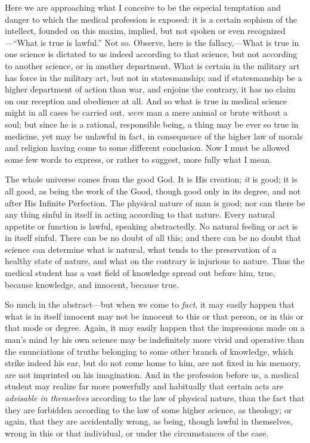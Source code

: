 Here we are approaching what I conceive to be the especial
temptation and danger to which the medical profession is exposed: it
is a certain sophism of the intellect, founded on this maxim, implied,
but not spoken or even recognized—``What is true is
lawful.'' Not so. Observe, here is the fallacy,—What is true in
one science is dictated to us indeed according to that science,
but not according to another science, or in another department. What
is certain in the military art has force in the military art, but not
in statesmanship; and if statesmanship be a higher department of
action than war, and enjoins the contrary, it has no claim on our
reception and obedience at all. And so what is true in medical science
might in all cases be carried out, \emph{were} man a mere animal or
brute without a soul; but since he is a rational, responsible being, a
thing may be ever so true in medicine, yet may be unlawful in fact, in
consequence of the higher law of morals and religion having come to
some different conclusion. Now I must be allowed some few words to
express, or rather to suggest, more fully what I mean.

The whole universe comes from the good God. It is His creation; \emph{it}
is good; it is all good, as being the work of the Good, though good
only in its degree, and not after His Infinite Perfection. The
physical nature of man is good; nor can there be any thing sinful in
itself in acting according to that nature. Every natural appetite or
function is lawful, speaking abstractedly. No natural feeling or act
is in itself sinful. There can be no doubt of all this; and there can
be no doubt that science can determine what is natural, what tends to
the preservation of a healthy state of nature, and what on the
contrary is injurious to nature. Thus the medical student has a vast
field of knowledge spread out before him, true, because knowledge, and
innocent, because true.

So much in the abstract—but when we come to \emph{fact}, it may
easily happen that what is in itself innocent may not be innocent to
this or that person, or in this or that mode or degree. Again, it may
easily happen that the impressions made on a man's mind by his own
science may be indefinitely more vivid and operative than the enunciations of truths belonging to some other branch of knowledge,
which strike indeed his ear, but do not come home to him, are not
fixed in his memory, are not imprinted on his imagination. And in the
profession before us, a medical student may realize far more
powerfully and habitually that certain acts are \emph{advisable in
themselves} according to the law of physical nature, than the fact
that they are forbidden according to the law of some higher science,
as theology; or again, that they are accidentally wrong, as being,
though lawful in themselves, wrong in this or that individual, or
under the circumstances of the case.

